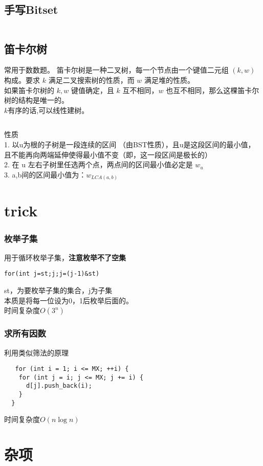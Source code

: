 \documentclass[a4paper]{report}
\newcommand{\cppcode}[1]{  
    \inputminted[mathescape]{cpp}{source/#1}  
}
\begin{document}
\section{手写Bitset}
\cppcode{Bitset.cpp}

\section{笛卡尔树}
常用于数数题。
笛卡尔树是一种二叉树，每一个节点由一个键值二元组 $(k,w)$构成。要求 $k$ 满足二叉搜索树的性质，而 $w$ 满足堆的性质。\\
如果笛卡尔树的 $k,w$ 键值确定，且 $k$ 互不相同，$w$ 也互不相同，那么这棵笛卡尔树的结构是唯一的。\\
$k$有序的话,可以线性建树。\\
\cppcode{dkrTree.cpp}
性质\\
1.  以u为根的子树是一段连续的区间 （由BST性质），且u是这段区间的最小值，且不能再向两端延伸使得最小值不变（即，这一段区间是极长的）\\
2. 在 u 左右子树里任选两个点，两点间的区间最小值必定是 $w_u$\\
3.  a,b间的区间最小值为：$w_{LCA(a,b)}$\\

\chapter{trick}

\subsection{枚举子集}

用于循环枚举子集，\textbf{注意枚举不了空集}
\begin{verbatim}  
for(int j=st;j;j=(j-1)&st) 
\end{verbatim}
st，为要枚举子集的集合，j为子集\\
本质是将每一位设为0，1后枚举后面的。\\
时间复杂度$O(3^n)$
\subsection{求所有因数}
利用类似筛法的原理\\
\begin{verbatim}  
   for (int i = 1; i <= MX; ++i) {
    for (int j = i; j <= MX; j += i) {
      d[j].push_back(i);
    }
  }
\end{verbatim}
时间复杂度$O(n\log{n})$
\chapter{杂项}
\end{document}
